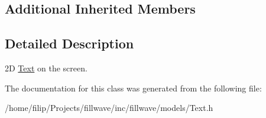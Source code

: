 \subsection*{Additional Inherited Members}


\subsection{Detailed Description}
2\+D \hyperlink{classfillwave_1_1models_1_1Text}{Text} on the screen. 

The documentation for this class was generated from the following file\+:\begin{DoxyCompactItemize}
\item 
/home/filip/\+Projects/fillwave/inc/fillwave/models/Text.\+h\end{DoxyCompactItemize}
